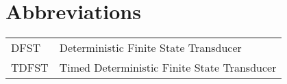 
\cleardoublepage
{}
{}
\chapter*{Abbreviations}
\label{section-abbrevs}

\begin{tabularx}{\textwidth}{lX}
  DFST & Deterministic Finite State Transducer\\
  TDFST & Timed Deterministic Finite State Transducer\\

\end{tabularx}
